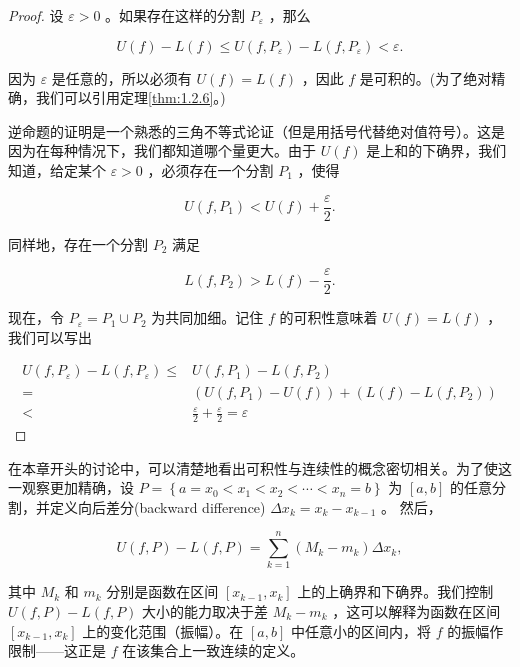 \begin{proof}
设 \(\varepsilon  > 0\) 。如果存在这样的分割 \({P}_{\varepsilon }\) ，那么

\[
U\left( f\right)  - L\left( f\right)  \leq  U\left( {f,{P}_{\varepsilon }}\right)  - L\left( {f,{P}_{\varepsilon }}\right)  < \varepsilon .
\]

因为 \(\varepsilon\) 是任意的，所以必须有 \(U\left( f\right)  = L\left( f\right)\) ，因此 \(f\) 是可积的。(为了绝对精确，我们可以引用定理\ref{thm:1.2.6}。)

逆命题的证明是一个熟悉的三角不等式论证（但是用括号代替绝对值符号）。这是因为在每种情况下，我们都知道哪个量更大。由于 \(U\left( f\right)\) 是上和的下确界，我们知道，给定某个 \(\varepsilon  > 0\) ，必须存在一个分割 \({P}_{1}\) ，使得

\[
U\left( {f,{P}_{1}}\right)  < U\left( f\right)  + \frac{\varepsilon }{2}.
\]

同样地，存在一个分割 \({P}_{2}\) 满足

\[
L\left( {f,{P}_{2}}\right)  > L\left( f\right)  - \frac{\varepsilon }{2}.
\]

现在，令 \({P}_{\varepsilon } = {P}_{1} \cup  {P}_{2}\) 为共同加细。记住 \(f\) 的可积性意味着 \(U\left( f\right)  = L\left( f\right)\) ，我们可以写出

\begin{align*}
U\left( {f,{P}_{\varepsilon }}\right)  - L\left( {f,{P}_{\varepsilon }}\right)  \leq &   U\left( {f,{P}_{1}}\right)  - L\left( {f,{P}_{2}}\right)\\
=  & \left( {U\left( {f,{P}_{1}}\right)  - U\left( f\right) }\right)  + \left( {L\left( f\right)  - L\left( {f,{P}_{2}}\right) }\right)\\
< &\frac{\varepsilon }{2} + \frac{\varepsilon }{2} = \varepsilon
\end{align*}
\end{proof}


在本章开头的讨论中，可以清楚地看出可积性与连续性的概念密切相关。为了使这一观察更加精确，设 \(P = \left\{  {a = {x}_{0} < {x}_{1} < {x}_{2} < \cdots  < {x}_{n} = b}\right\}\) 为 \(\left\lbrack  {a,b}\right\rbrack\) 的任意分割，并定义向后差分(backward difference) \(\Delta {x}_{k} = {x}_{k} - {x}_{k - 1}\) 。
然后，

\[
U\left( {f,P}\right)  - L\left( {f,P}\right)  = \mathop{\sum }\limits_{{k = 1}}^{n}\left( {{M}_{k} - {m}_{k}}\right) \Delta {x}_{k},
\]

其中 \({M}_{k}\) 和 \({m}_{k}\) 分别是函数在区间 \(\left\lbrack  {{x}_{k - 1},{x}_{k}}\right\rbrack\) 上的上确界和下确界。我们控制 \(U\left( {f,P}\right)  - L\left( {f,P}\right)\) 大小的能力取决于差 \({M}_{k} - {m}_{k}\) ，这可以解释为函数在区间 \(\left\lbrack  {{x}_{k - 1},{x}_{k}}\right\rbrack\) 上的变化范围（振幅）。在 \(\left\lbrack  {a,b}\right\rbrack\) 中任意小的区间内，将 \(f\) 的振幅作限制——这正是 \(f\) 在该集合上一致连续的定义。

